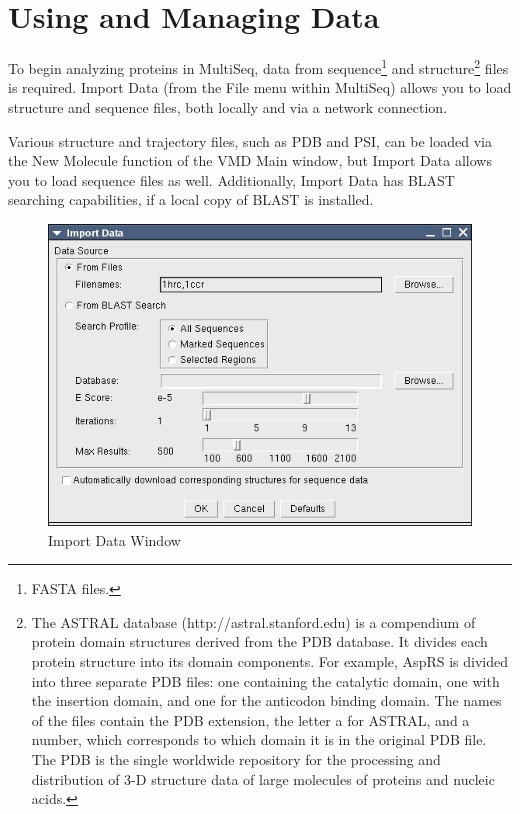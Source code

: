 \label{unit2}

\section{Using and Managing Data}
To begin analyzing proteins in MultiSeq, data from
sequence\footnote{FASTA files.} and
structure\footnote{The ASTRAL database (http://astral.stanford.edu) is a
compendium of protein domain structures derived from the PDB database.
It divides each protein structure into its domain components. For
example, AspRS is divided into three separate PDB files: one containing
the catalytic domain, one with the insertion domain, and one for the
anticodon binding domain. The names of the files contain the PDB
extension, the letter a for ASTRAL, and a number, which corresponds to
which domain it is in the original PDB file.  
The PDB is the single worldwide repository for the processing and
distribution of 3-D structure data of large molecules of proteins and
nucleic acids.} files is required.  Import Data (from the File menu
within MultiSeq) allows you to load
structure and sequence files, both locally and via a network connection.

Various structure and trajectory files, such as PDB and PSI, can be
loaded via the \textsf{New Molecule} function of the VMD Main window,
but \textsf{Import Data} allows you to load sequence files as well.
Additionally, Import Data has BLAST searching capabilities, if a local
copy of BLAST is installed.  

\begin{figure}[here]
 \centerline{\includegraphics [width=5in]{./pictures/import_data.jpg}}
 \caption{Import Data Window}%
\label{importData}
\end{figure}
